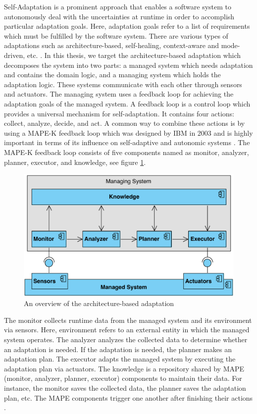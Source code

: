 \documentclass[a4paper,12pt]{article}
\begin{document}
Self-Adaptation is a prominent approach that enables a software system to autonomously deal with the uncertainties at runtime in order to accomplish particular adaptation goals. Here, adaptation goals refer to a list of requirements which must be fulfilled by the software system. There are various types of adaptations such as architecture-based, self-healing, context-aware and mode-driven, etc. \cite{SEFSAS-2009}. In this thesis, we target the architecture-based adaptation \cite{TVOAC-2003} which decomposes the system into two parts: a managed system which needs adaptation and contains the domain logic, and a managing system which holds the adaptation logic. These systems communicate with each other through sensors and actuators. The managing system uses a feedback loop for achieving the adaptation goals of the managed system. A feedback loop is a control loop which provides a universal mechanism for self-adaptation. It contains four actions: collect, analyze, decide, and act. A common way to combine these actions is by using a MAPE-K feedback loop which was designed by IBM in 2003 \cite{AABFAC-2005} and is highly important in terms of its influence on self-adaptive and autonomic systems \cite{MAAMAPEKFLFSA-2015}. The MAPE-K feedback loop consists of five components named as monitor, analyzer, planner, executor, and knowledge, see figure \ref{SelfAdaptiveSystem}. 
\begin{figure}[H]
	\centering
	\includegraphics[keepaspectratio, width=\linewidth]{figures/SelfAdaptiveSystem.pdf}
	\caption{An overview of the architecture-based adaptation}
	\label{SelfAdaptiveSystem}
\end{figure}
The monitor collects runtime data from the managed system and its environment via sensors. Here, environment refers to an external entity in which the managed system operates. The analyzer analyzes the collected data to determine whether an adaptation is needed. If the adaptation is needed, the planner makes an adaptation plan. The executor adapts the managed system by executing the adaptation plan via actuators. The knowledge is a repository shared by MAPE (monitor, analyzer, planner, executor) components to maintain their data. For instance, the monitor saves the collected data, the planner saves the adaptation plan, etc. The MAPE components trigger one another after finishing their actions \cite{MBSARFSAS-2016}.
\end{document}
